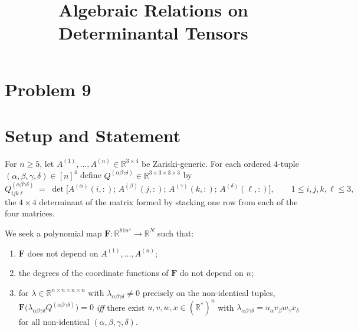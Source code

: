 \documentclass[11pt]{article}
\begin{document}
\endgroup

\clearpage
\section*{Problem 9}
\begingroup
\hypersetup{colorlinks=true,
            linkcolor=blue!50!black,
            citecolor=blue!50!black,
            urlcolor=blue!50!black}
\newcommand{\qnineR}{\mathbb{R}}
\newcommand{\qninesgn}{\operatorname{sgn}}
\newcommand{\qninerank}{\operatorname{rank}}
\newcommand{\qninemlrank}{\operatorname{mlrank}}
\newcommand{\qninebm}[1]{\mathbf{#1}}
\newcommand{\qninebQ}{\mathbf{Q}}
\newcommand{\qninebC}{\mathbf{C}}
\newcommand{\qninebA}{\mathbf{A}}
\newcommand{\qninebF}{\mathbf{F}}
\newcommand{\qnineDmat}{D}
\newtheorem{qninetheorem}{Theorem}
\newtheorem{qninelemma}{Lemma}
\newtheorem{qnineproposition}{Proposition}
\newtheorem{qninecorollary}{Corollary}
\title{Algebraic Relations on Determinantal Tensors}
\author{}
\date{}
\maketitle


\section*{Setup and Statement}

For $n\ge 5$, let $A^{(1)},\dots,A^{(n)}\in\qnineR^{3\times4}$ be Zariski-generic.
For each ordered $4$-tuple $(\alpha,\beta,\gamma,\delta)\in[n]^4$ define
$Q^{(\alpha\beta\gamma\delta)}\in\qnineR^{3\times3\times3\times3}$ by
\[
  Q^{(\alpha\beta\gamma\delta)}_{ijk\ell}
   \;=\; \det\!\bigl[A^{(\alpha)}(i,:);\,A^{(\beta)}(j,:);\,A^{(\gamma)}(k,:);\,A^{(\delta)}(\ell,:)\bigr],
   \qquad 1\le i,j,k,\ell\le 3,
\]
the $4\times4$ determinant of the matrix formed by stacking one row from each
of the four matrices.

We seek a polynomial map $\qninebF:\qnineR^{81n^4}\to\qnineR^{N}$ such that:
\begin{enumerate}\setlength\itemsep{2pt}
\item $\qninebF$ does not depend on $A^{(1)},\dots,A^{(n)}$;
\item the degrees of the coordinate functions of $\qninebF$ do not depend on $n$;
\item for $\lambda\in\qnineR^{n\times n\times n\times n}$ with $\lambda_{\alpha\beta\gamma\delta}\ne0$
      precisely on the non-identical tuples,
      $\qninebF\bigl(\lambda_{\alpha\beta\gamma\delta}Q^{(\alpha\beta\gamma\delta)}\bigr)=0$
      \emph{iff} there exist $u,v,w,x\in(\qnineR^{*})^n$ with
      $\lambda_{\alpha\beta\gamma\delta}=u_\alpha v_\beta w_\gamma x_\delta$ for
      all non-identical $(\alpha,\beta,\gamma,\delta)$.
\end{enumerate}
\end{document}
